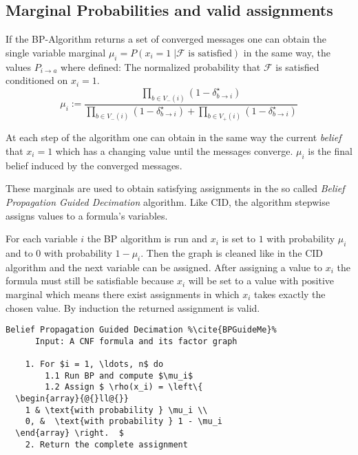 \subsection{Marginal Probabilities and valid assignments}

If the BP-Algorithm returns a set of converged messages one can obtain the single variable marginal $\mu_i = P(x_i = 1 \; | \mathcal{F} \text{ is satisfied})$ in the same way, the values $P_{i \rightarrow a}$ where defined: The normalized probability that $\mathcal{F}$ is satisfied conditioned on $x_i = 1$.
$$ \mu_i := \frac{\prod_{b \in V_-(i)} (1 - \delta^\star_{b \rightarrow i})}{\prod_{b \in V_-(i)} (1 - \delta^\star_{b \rightarrow i}) + \prod_{b \in V_+(i)} (1 - \delta^\star_{b \rightarrow i})}$$

At each step of the algorithm one can obtain in the same way the current \emph{belief} that $x_i = 1$ which has a changing value until the messages converge. $\mu_i$ is the final belief induced by the converged messages. \newline

These marginals are used to obtain satisfying assignments in the so called \emph{Belief Propagation Guided Decimation} algorithm. Like CID, the algorithm stepwise assigns  values to a formula's variables.

For each variable $i$ the BP algorithm is run and $x_i$ is set to $1$ with probability $\mu_i$ and to $0$ with probability $1 - \mu_i$. Then the graph is cleaned like in the CID algorithm and the next variable can be assigned. After assigning a value to $x_i$ the formula must still be satisfiable because $x_i$ will be set to a value with positive marginal which means there exist assignments in which $x_i$ takes exactly the chosen value. By induction the returned assignment is valid.

\begin{lstlisting}[mathescape=true, frame = single, escapechar=\%]
	Belief Propagation Guided Decimation %\cite{BPGuideMe}%
	  Input: A CNF formula and its factor graph
	  
	1. For $i = 1, \ldots, n$ do
		1.1 Run BP and compute $\mu_i$
		1.2 Assign $ \rho(x_i) = \left\{
  \begin{array}{@{}ll@{}}
    1 & \text{with probability } \mu_i \\
    0, &  \text{with probability } 1 - \mu_i 
  \end{array} \right.  $
	2. Return the complete assignment
\end{lstlisting}


